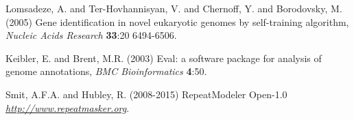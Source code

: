 \documentclass[a4paper,10pt]{report}
\begin{document}
\begin{thebibliography}{}
 Lomsadeze, A. and Ter-Hovhannisyan, V. and Chernoff, Y. and Borodovsky, M. (2005) Gene identification in novel eukaryotic genomes by self-training algorithm, \textit{Nucleic Acids Research} \textbf{33}:20 6494-6506.

 Keibler, E. and Brent, M.R. (2003) Eval: a software package for analysis of genome annotations, \textit{BMC Bioinformatics} \textbf{4}:50.

 Smit, A.F.A. and Hubley, R. (2008-2015) RepeatModeler Open-1.0 \textit{\url{http://www.repeatmasker.org}}.

\end{thebibliography}
\end{document}

